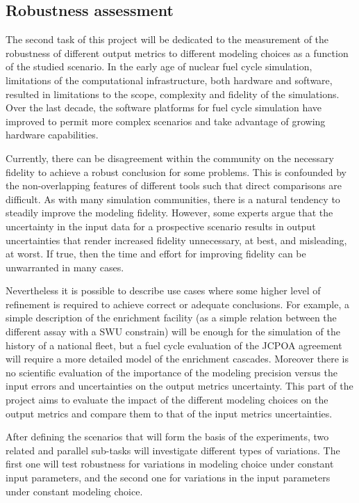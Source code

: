 
\subsection{Robustness assessment}

The second task of this project will be dedicated to the measurement of the
robustness of different output metrics to different modeling choices as a
function of the studied scenario.  In the early age of nuclear fuel cycle
simulation, limitations of the computational infrastructure, both hardware and
software, resulted in limitations to the scope, complexity and fidelity of the
simulations.  Over the last decade, the software platforms for fuel cycle
simulation have improved to permit more complex scenarios and take advantage
of growing hardware capabilities.

Currently, there can be disagreement within the community on the necessary
fidelity to achieve a robust conclusion for some problems.  This is confounded
by the non-overlapping features of different tools such that direct
comparisons are difficult. As with many simulation communities, there is a
natural tendency to steadily improve the modeling fidelity.  However, some
experts argue that the uncertainty in the input data for a prospective
scenario results in output uncertainties that render increased fidelity
unnecessary, at best, and misleading, at worst.  If true, then the time and
effort for improving fidelity can be unwarranted in many cases.

Nevertheless it is possible to describe use cases where some higher level of
refinement is required to achieve correct or adequate conclusions. For
example, a simple description of the enrichment facility (as a simple relation
between the different assay with a SWU constrain) will be enough for the
simulation of the history of a national fleet, but a fuel cycle evaluation of
the JCPOA agreement will require a more detailed model of the enrichment%
cascades. Moreover there is no scientific evaluation of the importance of the
modeling precision versus the input errors and uncertainties on the output
metrics uncertainty. This part of the project aims to evaluate the impact of
the different modeling choices on the output metrics and compare them to that
of the input metrics uncertainties.

After defining the scenarios that will form the basis of the experiments, two
related and parallel sub-tasks will investigate different types of variations.
The first one will test robustness for variations in modeling choice under
constant input parameters, and the second one for variations in the input
parameters under constant modeling choice.

